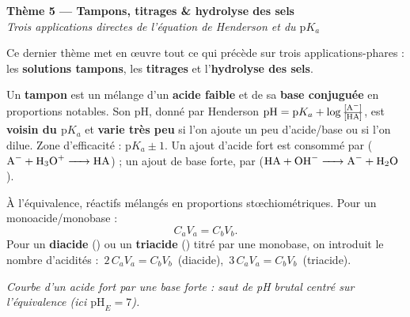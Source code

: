 \documentclass[11pt,a4paper]{article}
\begin{document}

\begin{center}
{\LARGE\bfseries\color{primarydark} Thème 5 — Tampons, titrages \& hydrolyse des sels}\\[2pt]
{\color{primary}\itshape Trois applications directes de l'équation de Henderson et du $\mathrm{p}K_a$}
\end{center}

\medskip
Ce dernier thème met en œuvre tout ce qui précède sur trois applications-phares : les \textbf{solutions
tampons}, les \textbf{titrages} et l'\textbf{hydrolyse des sels}.

\begin{cle}
Un \textbf{tampon} est un mélange d'un \textbf{acide faible} et de sa \textbf{base conjuguée} en proportions
notables. Son pH, donné par Henderson $\mathrm{pH} = \mathrm{p}K_a + \log\frac{[\ce{A-}]}{[\ce{HA}]}$, est
\textbf{voisin du $\mathrm{p}K_a$} et \textbf{varie très peu} si l'on ajoute un peu d'acide/base ou si l'on
dilue. Zone d'efficacité : $\mathrm{p}K_a \pm 1$. Un ajout d'acide fort est consommé par 
($\ce{A- + H3O+ -> HA}$) ; un ajout de base forte, par  ($\ce{HA + OH- -> A- + H2O}$).
\end{cle}

\begin{cle}
À l'équivalence, réactifs mélangés en proportions stœchiométriques. Pour un monoacide/monobase :
\[ \boxed{C_a V_a = C_b V_b}. \]
Pour un \textbf{diacide} () ou un \textbf{triacide} () titré par une monobase, on introduit
le nombre d'acidités : $\,2\,C_a V_a = C_b V_b\,$ (diacide), $\,3\,C_a V_a = C_b V_b\,$ (triacide).
\end{cle}

\begin{center}
\end{center}
\vspace{-2mm}
{\footnotesize\itshape Courbe d'un acide fort par une base forte : saut de pH brutal centré sur l'équivalence
(ici $\mathrm{pH}_E = 7$).}
\end{document}
